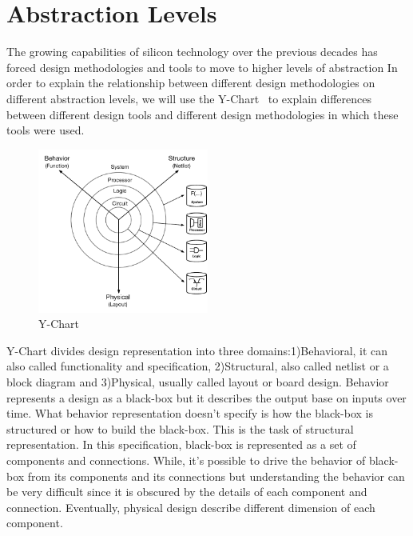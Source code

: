 

%


\section{Abstraction Levels}

The growing capabilities of silicon technology over the previous decades has forced design methodologies and tools to move to higher levels of abstraction
In order to explain the relationship between different design methodologies on
different abstraction levels, we will use the Y-Chart~\cite{walker_1985_y_model} to explain differences between different design tools and different design methodologies in which these tools were used.

\begin{figure}[h]
    \centering
    \includegraphics[width=0.5\textwidth]{figures/Introduction/Y-Chart.pdf}
    \caption{Y-Chart}
    \label{fig:y-chart}
\end{figure}

Y-Chart divides design representation into three domains:1)Behavioral, it can also called functionality and specification, 2)Structural, also called netlist or a block diagram and 3)Physical, usually called layout or board design. Behavior represents a design as a black-box but it describes the output base on inputs over time. What behavior representation doesn't specify is how the black-box is structured or how to build the black-box. This is the task of structural representation. In this specification, black-box is represented as a set of components and connections. While, it's possible to drive the behavior of black-box from its components and its connections but understanding the behavior can be very difficult since it is obscured by the details of each component and connection.
Eventually, physical design describe different dimension of each component.

